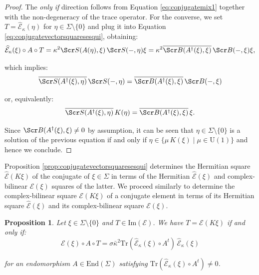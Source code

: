 \documentclass[10pt,a4paper,twoside,reqno]{amsart}
\theoremstyle{plain}
\newtheorem{prop}[thm]{Proposition}
\theoremstyle{definition}
\theoremstyle{remark}
\newcommand{\End}{\mathrm{End}}
\newcommand{\Tr}{\mathrm{Tr}}
\def\scB{\Scr B}
\def\scS{\Scr S}
\def\U{\mathrm{U}}
\def\cE{\mathcal{E}}
\def\hcE{\widehat{\mathcal{E}}}
\def\Im{\mathrm{Im}}
\begin{document}
\begin{proof}
The \emph{only if} direction follows from Equation \eqref{eq:conjugatemix1} together with the non-degeneracy of the trace operator. For the converse, we set $T = \hcE_{\kappa}(\eta)$ for $\eta \in \Sigma\setminus \{ 0\}$ and plug it into Equation \eqref{eq:conjugatevectorsquaresesqui}, obtaining:
\begin{equation*}
\hcE_{\kappa}(\xi) \circ A\circ T = \kappa^2 \scS(A(\eta) , \xi) \, \scS( - , \eta) \xi =  \kappa^2 \overline{\scB(A^{\dagger}(\xi),\xi)}\, \scB( - , \xi) \xi,
\end{equation*}

\noindent
which implies:
\begin{equation*}
\overline{\scS(A^{\dagger}(\xi) , \eta)} \, \scS( - , \eta)   = \overline{\scB(A^{\dagger}(\xi),\xi)}\, \scB( - , \xi) 
\end{equation*}

\noindent
or, equivalently:
\begin{equation*}
\overline{\scS(A^{\dagger}(\xi) , \eta)} \, K(\eta)  = \overline{\scB(A^{\dagger}(\xi),\xi)}\, \xi.
\end{equation*}

\noindent
Since $\scB(A^{\dagger}(\xi),\xi) \neq 0$ by assumption, it can be seen that $\eta\in  \Sigma\setminus \{ 0\}$ is a solution of the previous equation if and only if $\eta \in  \{ \mu\, K(\xi) \mid \mu \in \U(1) \}$ and hence we conclude.
\end{proof}

\noindent
Proposition \ref{prop:conjugatevectorsquaresesqui} determines the Hermitian square $\hcE(K\xi)$ of the conjugate of $\xi\in \Sigma$ in terms of the Hermitian $\hcE(\xi)$ and complex-bilinear $\cE(\xi)$ squares of the latter. We proceed similarly to determine the complex-bilinear square $\cE(K\xi)$ of a conjugate element in terms of its Hermitian square $\hcE(\xi)$ and its complex-bilinear square $\cE(\xi)$.

\begin{prop}
\label{prop:conjugatevectorsquare}
Let $\xi \in \Sigma\setminus \{ 0\}$ and $T\in \Im(\cE)$. We have $T = \cE(K\xi)$ if and only if:
\begin{equation*}
\cE(\xi) \circ A\circ T = \sigma \bar{\kappa}^{2}\Tr(\hcE_\kappa(\xi) \circ A^{t}) \, \hcE_\kappa(\xi) 
\end{equation*}

\noindent
for an endomorphism $A\in \End(\Sigma)$ satisfying $\Tr(\hcE_\kappa(\xi) \circ A^{t}) \neq 0$.
\end{prop}
\end{document}
